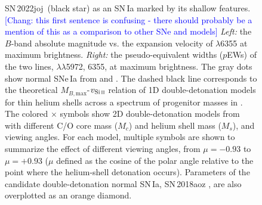 \documentclass[twocolumn]{aastex631}
\newcommand{\sn}{SN\,2022joj}
\newcommand{\chang}[1]{\textcolor{blue}{[Chang: #1]}}
\begin{document}
\begin{CJK*}{UTF8}{gbsn}
\begin{figure}
    \caption{\sn\ (black star) as an SN\,Ia marked by its shallow  features. \chang{this first sentence is confusing - there should probably be a mention of this as a comparison to other SNe and models} \textit{Left:} the $B$-band absolute magnitude vs. the expansion velocity of  $\lambda$6355 at maximum brightness. \textit{Right:} the pseudo-equivalent widths ($p$EWs) of the two  lines,  $\lambda\lambda$5972, 6355, at maximum brightness. The gray dots show normal SNe\,Ia from \citet{Zheng_2018} and \citet{Burrow_2020}. The dashed black line corresponds to the theoretical $M_{B,\mathrm{max}}$-$v_\mathrm{Si\,\textsc{ii}}$ relation of 1D double-detonation models for thin helium shells across a spectrum of progenitor masses in \citet{polin_observational_2019}. The colored $\times$ symbols show 2D double-detonation models from \citet{Shen_2D_2021} with different C/O core mass ($M_c$) and helium shell mass ($M_s$), and viewing angles. For each model, multiple symbols are shown to summarize the effect of different viewing angles, from $\mu = -0.93$ to $\mu=+0.93$ ($\mu$ defined as the cosine of the polar angle relative to the point where the helium-shell detonation occurs). Parameters of the candidate double-detonation normal SN\,Ia, SN\,2018aoz \citep{Ni_18aoz_2023}, are also overplotted as an orange diamond.}
    \label{fig:phase_space}
\end{figure}


\end{CJK*}
\end{document}
